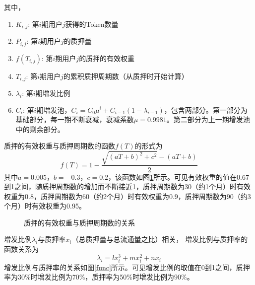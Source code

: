 其中，
\begin{enumerate}
   \item \(K_{i,j}\): 第\(i\)期用户\(j\)获得的Token数量
   \item \(P_{i,j}\): 第\(i\)期用户\(j\)的质押量
   \item \(f(T_{i,j})\): 第\(i\)期用户\(j\)的质押的有效权重
   \item \(T_{i,j}\): 第\(i\)期用户\(j\)的累积质押周期数（从质押时开始计算）
   \item \(\lambda_i\): 第\(i\)期增发比例
   \item \(C_i\): 第\(i\)期增发池，\(C_i = C_0 \mu^i + C_{i-1} (1-\lambda_{i-1})\)，包含两部分。第一部分为基础部分，每一期不断衰减，衰减系数$\mu=0.9981$。第二部分为上一期增发池中的剩余部分。
\end{enumerate}

质押的有效权重与质押周期数的函数\(f(T)\)的形式为
  \begin{equation}
    f(T) = 1 - \frac{\sqrt{(aT+b)^2+c^2}-(aT+b)}{2}
  \end{equation}
其中\(a=0.005\)，\(b=-0.3\)，\(c=0.2\)，该函数如图\ref{weight}所示。可见有效权重的值在0.67到1之间，随质押周期数的增加而不断接近1，质押周期数为30（约1个月）时有效权重为0.8，质押周期数为60（约2个月）时有效权重为0.9，质押周期数为90（约3个月）时有效权重为0.95。

\begin{figure}
\centering
    \caption{质押的有效权重与质押周期数的关系}\label{weight}
\end{figure}

增发比例\(\lambda_i\)与质押率\(x_i\)（总质押量与总流通量之比）相关，
增发比例与质押率的函数关系为
  \begin{equation}
    \lambda_i = l x_i^3 + m x_i^2 + n x_i
  \end{equation}
增发比例与质押率的关系如图\ref{func}所示。可见增发比例的取值在0到1之间，质押率为30\%时增发比例为70\%，质押率为50\%时增发比例为90\%。


